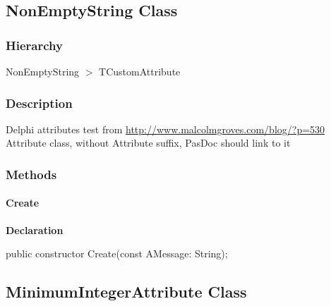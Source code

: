 \documentclass{report}
\newif\ifpdf
\begin{document}
\subsection*{NonEmptyString Class}
\fi
\label{ok_attributes.NonEmptyString}
\subsubsection*{\large{\textbf{Hierarchy}}\normalsize\hspace{1ex}\hfill}
NonEmptyString {$>$} TCustomAttribute
\subsubsection*{\large{\textbf{Description}}\normalsize\hspace{1ex}\hfill}
Delphi attributes test from \href{http://www.malcolmgroves.com/blog/?p=530}{http://www.malcolmgroves.com/blog/?p=530} Attribute class, without Attribute suffix, PasDoc should link to it\subsubsection*{\large{\textbf{Methods}}\normalsize\hspace{1ex}\hfill}
\paragraph*{Create}\hspace*{\fill}

\label{ok_attributes.NonEmptyString-Create}
\begin{list}{}{
\setlength{\itemindent}{0cm}
\setlength{\listparindent}{0cm}
\setlength{\leftmargin}{\evensidemargin}
\addtolength{\leftmargin}{\tmplength}
\settowidth{\labelsep}{X}
\addtolength{\leftmargin}{\labelsep}
\setlength{\labelwidth}{\tmplength}
}
\item[\textbf{Declaration}\hfill]
\ifpdf
\begin{flushleft}
\fi
\begin{ttfamily}
public constructor Create(const AMessage: String);\end{ttfamily}

\ifpdf
\end{flushleft}
\fi

\end{list}
\ifpdf
\subsection*{\large{\textbf{MinimumIntegerAttribute Class}}\normalsize\hspace{1ex}\hrulefill}
\else
\end{document}
